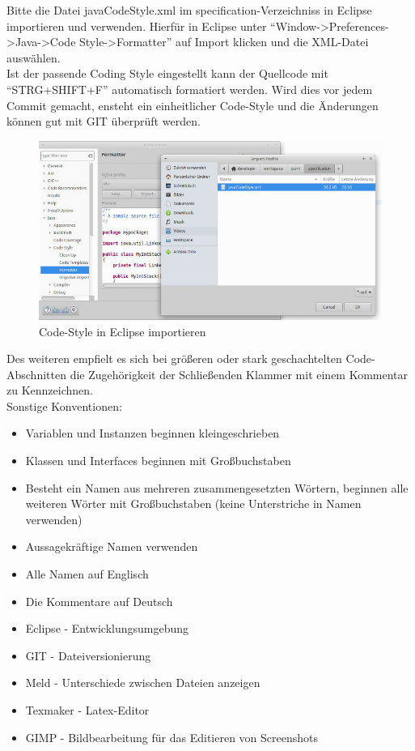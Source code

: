 \documentclass[twoside]{report}
\begin{document}
Bitte die Datei javaCodeStyle.xml im specification-Verzeichniss in Eclipse importieren und verwenden.
Hierfür in Eclipse unter "`Window->Preferences->Java->Code Style->Formatter"' auf Import klicken und die XML-Datei auswählen.\\
Ist der passende Coding Style eingestellt kann der Quellcode mit "`STRG+SHIFT+F"' automatisch formatiert werden.
Wird dies vor jedem Commit gemacht, ensteht ein einheitlicher Code-Style und die Änderungen können gut mit GIT überprüft werden.\\
\begin{figure}[hbtp]
\centering
\includegraphics[scale=0.5]{Bilder/importCodeStyle}
\caption{Code-Style in Eclipse importieren}
\end{figure}
Des weiteren empfielt es sich bei größeren oder stark geschachtelten Code-Abschnitten die Zugehörigkeit der Schließenden Klammer mit einem Kommentar zu Kennzeichnen.\\
Sonstige Konventionen:
\begin{itemize}
\item{Variablen und Instanzen beginnen kleingeschrieben}
\item{Klassen und Interfaces beginnen mit Großbuchstaben}
\item{Besteht ein Namen aus mehreren zusammengesetzten Wörtern, beginnen alle weiteren Wörter mit Großbuchstaben (keine Unterstriche in Namen verwenden)}
\item{Aussagekräftige Namen verwenden}
\item{Alle Namen auf Englisch}
\item{Die Kommentare auf Deutsch}
\end{itemize}

\nsecend

\begin{itemize}
\item{Eclipse - Entwicklungsumgebung}
\item{GIT - Dateiversionierung}
\item{Meld - Unterschiede zwischen Dateien anzeigen}
\item{Texmaker - Latex-Editor}
\item{GIMP - Bildbearbeitung für das Editieren von Screenshots}
\end{itemize}
\nsecend
\end{document}
